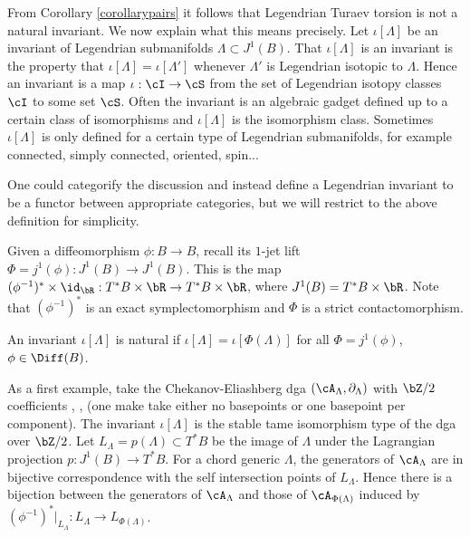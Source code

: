 From Corollary \ref{corollarypairs} it follows that Legendrian Turaev torsion is not a natural invariant. We now explain what this means precisely. Let $\iota[\Lambda]$ be an invariant of Legendrian submanifolds $\Lambda \subset J^1(B)$. That $\iota[\Lambda]$ is an invariant is the property that $\iota[\Lambda]=\iota[\Lambda']$ whenever $\Lambda'$ is Legendrian isotopic to $\Lambda$. Hence an invariant is a map $\iota: \cI \to \cS$ from the set of Legendrian isotopy classes $\cI$ to some set $\cS$. Often the invariant is an algebraic gadget defined up to a certain class of isomorphisms and $\iota[\Lambda]$ is the isomorphism class. Sometimes $\iota[\Lambda]$ is only defined for a certain type of Legendrian submanifolds, for example connected, simply connected, oriented, spin...

\begin{remark}
One could categorify the discussion and instead define a Legendrian invariant to be a functor between appropriate categories, but we will restrict to the above definition for simplicity.
\end{remark}

Given a diffeomorphism $\phi:B \to B$, recall its $1$-jet lift $\Phi=j^1(\phi):J^1(B) \to J^1(B)$. This is the map $(\phi^{-1})^* \times \id_{\bR} : T^*B \times \bR \to T^*B \times \bR$, where $J^1(B)=T^*B \times \bR$. Note that $(\phi^{-1})^*$ is an exact symplectomorphism and $\Phi$ is a strict contactomorphism.

\begin{definition}\label{def: naturality}
An invariant $\iota[\Lambda]$ is natural if $\iota[\Lambda]=\iota[\Phi(\Lambda)]$ for all $\Phi=j^1(\phi)$, $\phi \in \Diff(B)$.
\end{definition}

As a first example, take the Chekanov-Eliashberg dga $(\cA_{\Lambda}, \partial_{\Lambda})$ with $\bZ/2$ coefficients \cite{C02}, \cite{E98}, \cite{EES07} (one make take either no basepoints or one basepoint per component). The invariant $\iota[\Lambda]$ is the stable tame isomorphism type of the dga over $\bZ/2$. Let $L_{\Lambda}=p(\Lambda) \subset T^*B$ be the image of $\Lambda$ under the Lagrangian projection $p:J^1(B) \to T^*B$. For a chord generic $\Lambda$, the generators of $\cA_{\Lambda}$ are in bijective correspondence with the self intersection points of $L_{\Lambda}$. Hence there is a bijection between the generators of $\cA_{\Lambda}$ and those of $\cA_{\Phi(\Lambda)}$ induced by $(\phi^{-1})^*|_{L_\Lambda}: L_\Lambda \to L_{\Phi(\Lambda)}$.

